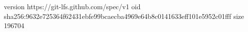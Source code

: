 version https://git-lfs.github.com/spec/v1
oid sha256:9632e725364f62431ebfe99bcaecba4969e64b8c0141633eff101e5952c01fff
size 196704
